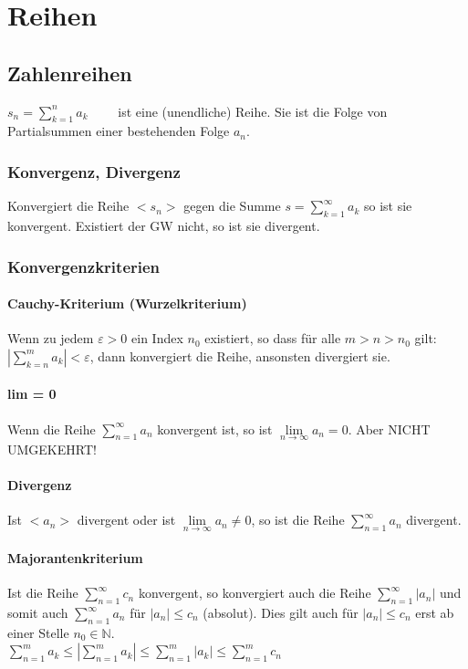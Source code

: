 
\section{Reihen}

\subsection{Zahlenreihen}
$ s_n = \sum\limits_{k=1}^{n} a_k \qquad $ ist eine (unendliche) Reihe. Sie ist die Folge von Partialsummen einer bestehenden Folge $a_n$.

\subsubsection{Konvergenz, Divergenz}
Konvergiert die Reihe $< s_n >$ gegen die Summe $ s = \sum\limits_{k=1}^{\infty} a_k $ so ist sie konvergent. 
Existiert der GW nicht, so ist sie divergent.

\subsubsection{Konvergenzkriterien}

\paragraph{Cauchy-Kriterium (Wurzelkriterium)} 
Wenn zu jedem $\varepsilon > 0$ ein Index $n_0$ existiert, so dass für alle $m > n > n_0$ gilt: \\
$\left| \sum\limits_{k=n}^m a_k \right| < \varepsilon$, dann konvergiert die Reihe, ansonsten divergiert sie.

\paragraph{lim = 0}
Wenn die Reihe $ \sum\limits_{n=1}^{\infty} a_n $ konvergent ist, so ist $\lim\limits_{n \to \infty} a_n = 0$. \hspace{2cm} Aber NICHT UMGEKEHRT!

\paragraph{Divergenz}
Ist $<a_n>$ divergent oder ist $\lim\limits_{n \to \infty} a_n \neq 0$, so ist die Reihe $ \sum\limits_{n=1}^{\infty} a_n $ divergent.

\paragraph{Majorantenkriterium}
Ist die Reihe $ \sum\limits_{n=1}^{\infty} c_n $ konvergent, so konvergiert auch die Reihe $ \sum\limits_{n=1}^{\infty} |a_n|$ und somit auch
$\sum\limits_{n=1}^{\infty} a_n$ für $|a_n| \leq c_n$ (absolut).
Dies gilt auch für $|a_n| \leq c_n$ erst ab einer Stelle $n_0 \in \mathbb{N}$.\\
$\sum\limits_{n=1}^{m}a_k \leq |\sum\limits_{n=1}^{m}a_k| \leq \sum\limits_{n=1}^{m}|a_k| \leq \sum\limits_{n=1}^{m}c_n$

